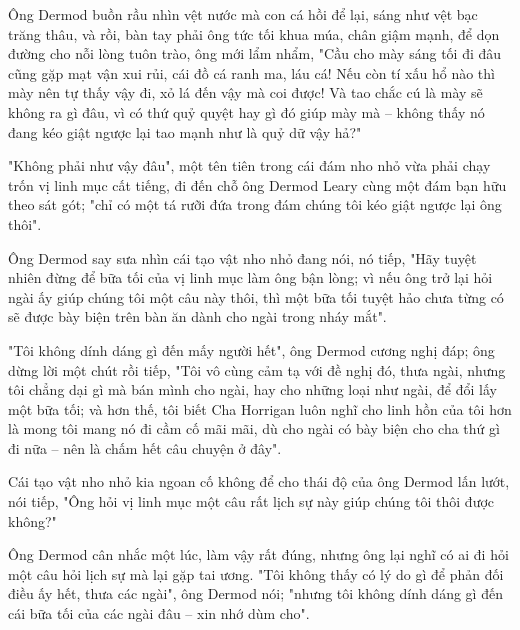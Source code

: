 Ông Dermod buồn rầu nhìn vệt nước mà con cá hồi để lại, sáng như vệt bạc trăng thâu, và rồi, bàn tay phải ông tức tối khua múa, chân giậm mạnh, để dọn đường cho nỗi lòng tuôn trào, ông mới lẩm nhẩm, "Cầu cho mày sáng tối đi đâu cũng gặp mạt vận xui rủi, cái đồ cá ranh ma, láu cá! Nếu còn tí xấu hổ nào thì mày nên tự thấy vậy đi, xỏ lá đến vậy mà coi được! Và tao chắc cú là mày sẽ không ra gì đâu, vì có thứ quỷ quyệt hay gì đó giúp mày mà – không thấy nó đang kéo giật ngược lại tao mạnh như là quỷ dữ vậy hả?"

"Không phải như vậy đâu", một tên tiên trong cái đám nho nhỏ vừa phải chạy trốn vị linh mục cất tiếng, đi đến chỗ ông Dermod Leary cùng một đám bạn hữu theo sát gót; "chỉ có một tá rưỡi đứa trong đám chúng tôi kéo giật ngược lại ông thôi".

Ông Dermod say sưa nhìn cái tạo vật nho nhỏ đang nói, nó tiếp, "Hãy tuyệt nhiên đừng để bữa tối của vị linh mục làm ông bận lòng; vì nếu ông trở lại hỏi ngài ấy giúp chúng tôi một câu này thôi, thì một bữa tối tuyệt hảo chưa từng có sẽ được bày biện trên bàn ăn dành cho ngài trong nháy mắt".

"Tôi không dính dáng gì đến mấy người hết", ông Dermod cương nghị đáp; ông dừng lời một chút rồi tiếp, "Tôi vô cùng cảm tạ với đề nghị đó, thưa ngài, nhưng tôi chẳng dại gì mà bán mình cho ngài, hay cho những loại như ngài, để đổi lấy một bữa tối; và hơn thế, tôi biết Cha Horrigan luôn nghĩ cho linh hồn của tôi hơn là mong tôi mang nó đi cầm cố mãi mãi, dù cho ngài có bày biện cho cha thứ gì đi nữa – nên là chấm hết câu chuyện ở đây".

Cái tạo vật nho nhỏ kia ngoan cố không để cho thái độ của ông Dermod lấn lướt, nói tiếp, "Ông hỏi vị linh mục một câu rất lịch sự này giúp chúng tôi thôi được không?"

Ông Dermod cân nhắc một lúc, làm vậy rất đúng, nhưng ông lại nghĩ có ai đi hỏi một câu hỏi lịch sự mà lại gặp tai ương. "Tôi không thấy có lý do gì để phản đối điều ấy hết, thưa các ngài", ông Dermod nói; "nhưng tôi không dính dáng gì đến cái bữa tối của các ngài đâu – xin nhớ dùm cho".